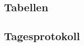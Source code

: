 \documentclass[12pt,a4paper]{article}
\begin{document}
\subsection{Tabellen}
\subsection{Tagesprotokoll}
\end{document}
